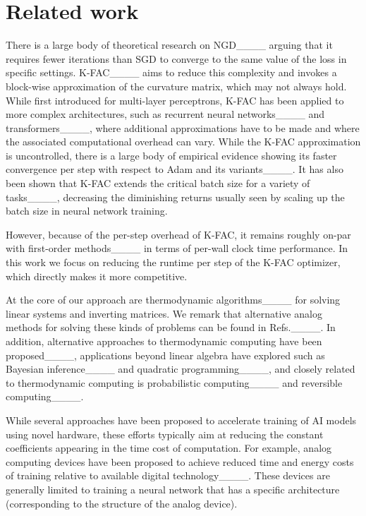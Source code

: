 \section{Related work}
There is a large body of theoretical research on NGD____ arguing that it requires fewer iterations than SGD to converge to the same value of the loss in specific settings. K-FAC____ aims to reduce this complexity and invokes a block-wise approximation of the curvature matrix, which may not always hold. While first introduced for multi-layer perceptrons, K-FAC has been applied to more complex architectures, such as recurrent neural networks____ and transformers____, where additional approximations have to be made and where the associated computational overhead can vary. While the K-FAC approximation is uncontrolled, there is a large body of empirical evidence showing its faster convergence per step with respect to Adam and its variants____. It has also been shown that K-FAC extends the critical batch size for a variety of tasks____, decreasing the diminishing returns usually seen by scaling up the batch size in neural network training.

However, because of the per-step overhead of K-FAC, it remains roughly on-par with first-order methods____ in terms of per-wall clock time performance. In this work we focus on reducing the runtime per step of the K-FAC optimizer, which directly makes it more competitive. 





At the core of our approach are thermodynamic algorithms____ for solving linear systems and inverting matrices. We remark that alternative analog methods for solving these kinds of problems can be found in Refs.____. In addition, alternative approaches to thermodynamic computing have been proposed____, applications beyond linear algebra have explored such as Bayesian inference____ and quadratic programming____, and closely related to thermodynamic computing is probabilistic computing____ and reversible computing____. 


While several approaches have been proposed to accelerate training of AI models using novel hardware, these efforts typically aim at reducing the constant coefficients appearing in the time cost of computation. For example, analog computing devices have been proposed to achieve reduced
time and energy costs of training relative to available digital technology____. These devices are generally limited to training a neural network that has a specific architecture (corresponding to the
structure of the analog device). 

